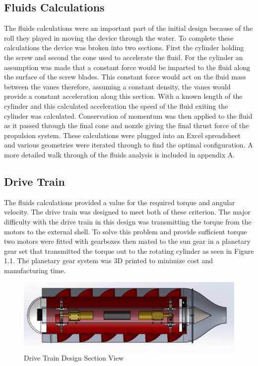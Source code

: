 \documentclass{report}
\begin{document}
\subsection{Fluids Calculations}
The fluids calculations were an important part of the initial design because of the roll they played in moving the device through the water. To complete these calculations the device was broken into two sections. First the cylinder holding the screw and second the cone used to accelerate the fluid. For the cylinder an assumption was made that a constant force would be imparted to the fluid along the surface of the screw blades. This constant force would act on the fluid mass between the vanes therefore, assuming a constant density, the vanes would provide a constant acceleration along this section. With a known length of the cylinder and this calculated acceleration the speed of the fluid exiting the cylinder was calculated. Conservation of momentum was then applied to the fluid as it passed through the final cone and nozzle giving the final thrust force of the propulsion system. These calculations were plugged into an Excel spreadsheet and various geometries were iterated through to find the optimal configuration. A more detailed walk through of the fluids analysis is included in appendix A.
\subsection{Drive Train}
The fluids calculations provided a value for the required torque and angular velocity. The drive train was designed to meet both of these criterion. The major difficulty with the drive train in this design was transmitting the torque from the motors to the external shell. To solve this problem and provide sufficient torque two motors were fitted with gearboxes then mated to the sun gear in a planetary gear set that transmitted the torque out to the rotating cylinder as seen in Figure 1.1. The planetary gear system was 3D printed to minimize cost and manufacturing time.
\begin{figure}[h]
\centering
\includegraphics[width=15cm]{"Section View"}
\caption{Drive Train Design Section View}
\end{figure}
\end{document}
